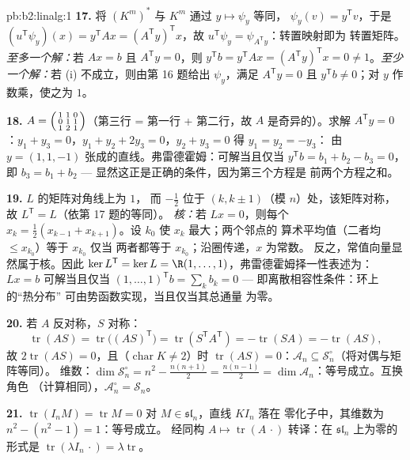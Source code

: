 \begin{solution}{pb:b2:linalg:1}
\textbf{17.} 将 $(K^m)^*$ 与 $K^m$ 通过 $y \mapsto \psi_y$ 等同，
$\psi_y(v) = y^{\mathsf T}v$，于是 $(u^{\mathsf T}\psi_y)(x) =
y^{\mathsf T}Ax = (A^{\mathsf T}y)^{\mathsf T}x$，故 $u^{\mathsf
T}\psi_y = \psi_{A^{\mathsf T}y}$：转置映射即为
转置矩阵。\emph{至多一个解：}若 $Ax = b$ 且
$A^{\mathsf T}y = 0$，则 $y^{\mathsf T}b = y^{\mathsf T}Ax =
(A^{\mathsf T}y)^{\mathsf T}x = 0 \neq 1$。\emph{至少一个解：}若
(i) 不成立，则由第 16 题给出 $\psi_y$，满足 $A^{\mathsf T}y
= 0$ 且 $y^{\mathsf T}b \neq 0$；对 $y$ 作数乘，使之为 $1$。

\textbf{18.} $A = \begin{psmallmatrix} 1 & 1 & 0\\ 0 & 1 & 1\\
1 & 2 & 1\end{psmallmatrix}$（第三行 = 第一行 + 第二行，故 $A$
是奇异的）。求解 $A^{\mathsf T}y = 0$：$y_1 + y_3 = 0$，$y_1
+ y_2 + 2y_3 = 0$，$y_2 + y_3 = 0$ 得 $y_1 = y_2 = -y_3$：
由 $y = (1, 1, -1)$ 张成的直线。弗雷德霍姆：可解当且仅当
$y^{\mathsf T}b = b_1 + b_2 - b_3 = 0$，即 $b_3 = b_1 + b_2$
--- 显然这正是正确的条件，因为第三个方程是
前两个方程之和。

\textbf{19.} $L$ 的矩阵对角线上为 $1$，
而 $-\frac12$ 位于 $(k, k\pm1)$（模 $n$）处，该矩阵对称，故
$L^{\mathsf T} = L$（依第 17 题的等同）。
\emph{核：}若 $Lx = 0$，则每个 $x_k = \frac12(x_{k-1} +
x_{k+1})$。设 $k_0$ 使 $x_k$ 最大；两个邻点的
算术平均值（二者均 $\leq x_{k_0}$）等于 $x_{k_0}$ 仅当
两者都等于 $x_{k_0}$；沿圈传递，$x$ 为常数。
反之，常值向量显然属于核。因此 $\ker L^{\mathsf T} = \ker L
= \R(1, \dots, 1)$，弗雷德霍姆择一性表述为：$Lx = b$
可解当且仅当 $(1,\dots,1)^{\mathsf T} b = \sum_k b_k = 0$ ---
即离散相容性条件：环上的“热分布”
可由势函数实现，当且仅当其总通量
为零。

\textbf{20.} 若 $A$ 反对称，$S$ 对称：
\[
\operatorname{tr}(AS) = \operatorname{tr}\bigl((AS)^{\mathsf
T}\bigr) = \operatorname{tr}(S^{\mathsf T}A^{\mathsf T}) =
-\operatorname{tr}(SA) = -\operatorname{tr}(AS),
\]
故 $2\operatorname{tr}(AS) = 0$，且（$\operatorname{char} K \neq
2$）时 $\operatorname{tr}(AS) = 0$：$\mathcal{A}_n \subseteq
\mathcal{S}_n^\circ$（将对偶与矩阵等同）。
维数：$\dim\mathcal{S}_n^\circ = n^2 - \frac{n(n+1)}2 =
\frac{n(n-1)}2 = \dim\mathcal{A}_n$：等号成立。互换角色
（计算相同），$\mathcal{A}_n^\circ = \mathcal{S}_n$。

\textbf{21.} $\operatorname{tr}(I_nM) = \operatorname{tr} M = 0$
对 $M \in \mathfrak{sl}_n$，直线 $KI_n$ 落在
零化子中，其维数为 $n^2 - (n^2 - 1) = 1$：等号成立。
经同构 $A \mapsto
\operatorname{tr}(A\,\cdot)$ 转译：在
$\mathfrak{sl}_n$ 上为零的形式是 $\operatorname{tr}(\lambda I_n\,\cdot) =
\lambda\operatorname{tr}$。


\end{solution}
